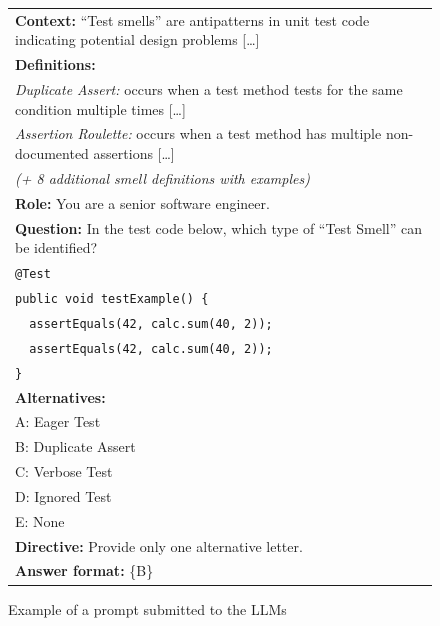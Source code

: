 \documentclass[sigconf]{acmart}
\begin{document}
\begin{figure}[htb]
    \centering
    \scriptsize
    \begin{tabular}{|p{}|}
        \hline
        \textbf{Context:} ``Test smells'' are antipatterns in unit test code indicating potential design problems [\ldots] \\[4pt]
        \textbf{Definitions:} \\
        \textit{Duplicate Assert:} occurs when a test method tests for the same condition multiple times [\ldots] \\
        \textit{Assertion Roulette:} occurs when a test method has multiple non-documented assertions [\ldots] \\
        \hfill \textit{(+ 8 additional smell definitions with examples)} \\[4pt]
        \textbf{Role:} You are a senior software engineer. \\[4pt]
        \textbf{Question:} In the test code below, which type of ``Test Smell'' can be identified? \\[4pt]
        \texttt{@Test} \\
        \texttt{public void testExample() \{} \\
        \texttt{~~assertEquals(42, calc.sum(40, 2));} \\
        \texttt{~~assertEquals(42, calc.sum(40, 2));} \\
        \texttt{\}} \\[4pt]
        \textbf{Alternatives:} \\
        A: Eager Test \\
        B: Duplicate Assert \\
        C: Verbose Test \\
        D: Ignored Test \\
        E: None \\[4pt]
        \textbf{Directive:} Provide only one alternative letter. \\
        \textbf{Answer format:} \{B\} \\
        \hline
    \end{tabular}
    \caption{Example of a prompt submitted to the LLMs}
    \label{fig:prompt_example}
    \vspace{-10px}
\end{figure} %
\end{document}
